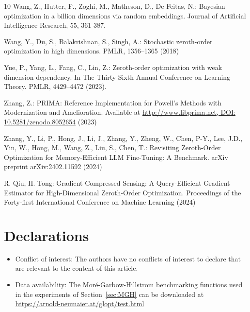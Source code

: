 \begin{thebibliography}{10}
Wang, Z., Hutter, F., Zoghi, M., Matheson, D., De Feitas, N.: Bayesian optimization in a billion dimensions via random embeddings. Journal of Artificial Intelligence Research, 55, 361-387.

 Wang, Y., Du, S., Balakrishnan, S., Singh, A.: Stochastic zeroth-order optimization in high dimensions. PMLR, 1356--1365 (2018) 

Yue, P., Yang, L., Fang, C., Lin, Z.: Zeroth-order optimization with weak dimension dependency. In The Thirty Sixth Annual Conference on Learning Theory. PMLR, 4429--4472 (2023).

 Zhang, Z.: PRIMA: Reference Implementation for Powell's Methods with Modernization and Amelioration. Available at \url{http://www.libprima.net, DOI: 10.5281/zenodo.8052654} (2023)

 Zhang, Y., Li, P., Hong, J., Li, J., Zhang, Y., Zheng, W., Chen, P-Y., Lee, J.D., Yin, W., Hong, M., Wang, Z., Liu, S., Chen, T.: Revisiting Zeroth-Order Optimization for Memory-Efficient LLM Fine-Tuning: A Benchmark. arXiv preprint arXiv:2402.11592 (2024)

 R. Qiu, H. Tong: Gradient Compressed Sensing: A Query-Efficient Gradient Estimator for High-Dimensional Zeroth-Order Optimization. Proceedings of the Forty-first International Conference on Machine Learning (2024)


\end{thebibliography}

\section*{Declarations}
\begin{itemize}
\item Conflict of interest: The authors have no conflicts of interest to declare that are relevant to the content of this article.
\item Data availability: The Mor\'{e}-Garbow-Hillstrom benchmarking functions used in the experiments of Section~\ref{sec:MGH} can be downloaded at \url{https://arnold-neumaier.at/glopt/test.html}
\end{itemize}



